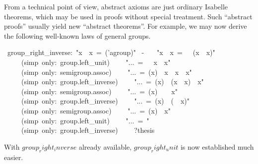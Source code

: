 \begin{isabelle}
\begin{isamarkuptext}
 \medskip From a technical point of view, abstract axioms are just
 ordinary Isabelle theorems, which may be used in proofs without
 special treatment.  Such ``abstract proofs'' usually yield new
 ``abstract theorems''.  For example, we may now derive the following
 well-known laws of general groups.%
\end{isamarkuptext}%
\ group\_right\_inverse:\ {"}x\ {\isasymOtimes}\ x{\isasyminv}\ =\ ({\isasymunit}{\isasymColon}'a{\isasymColon}group){"}\isanewline
{}\ -\isanewline
\ \ \ {"}x\ {\isasymOtimes}\ x{\isasyminv}\ =\ {\isasymunit}\ {\isasymOtimes}\ (x\ {\isasymOtimes}\ x{\isasyminv}){"}\isanewline
\ \ \ \ \ (simp\ only:\ group.left\_unit)\isanewline
\ \ \ \ {"}...\ =\ {\isasymunit}\ {\isasymOtimes}\ x\ {\isasymOtimes}\ x{\isasyminv}{"}\isanewline
\ \ \ \ \ (simp\ only:\ semigroup.assoc)\isanewline
\ \ \ \ {"}...\ =\ (x{\isasyminv}){\isasyminv}\ {\isasymOtimes}\ x{\isasyminv}\ {\isasymOtimes}\ x\ {\isasymOtimes}\ x{\isasyminv}{"}\isanewline
\ \ \ \ \ (simp\ only:\ group.left\_inverse)\isanewline
\ \ \ \ {"}...\ =\ (x{\isasyminv}){\isasyminv}\ {\isasymOtimes}\ (x{\isasyminv}\ {\isasymOtimes}\ x)\ {\isasymOtimes}\ x{\isasyminv}{"}\isanewline
\ \ \ \ \ (simp\ only:\ semigroup.assoc)\isanewline
\ \ \ \ {"}...\ =\ (x{\isasyminv}){\isasyminv}\ {\isasymOtimes}\ {\isasymunit}\ {\isasymOtimes}\ x{\isasyminv}{"}\isanewline
\ \ \ \ \ (simp\ only:\ group.left\_inverse)\isanewline
\ \ \ \ {"}...\ =\ (x{\isasyminv}){\isasyminv}\ {\isasymOtimes}\ ({\isasymunit}\ {\isasymOtimes}\ x{\isasyminv}){"}\isanewline
\ \ \ \ \ (simp\ only:\ semigroup.assoc)\isanewline
\ \ \ \ {"}...\ =\ (x{\isasyminv}){\isasyminv}\ {\isasymOtimes}\ x{\isasyminv}{"}\isanewline
\ \ \ \ \ (simp\ only:\ group.left\_unit)\isanewline
\ \ \ \ {"}...\ =\ {\isasymunit}{"}\isanewline
\ \ \ \ \ (simp\ only:\ group.left\_inverse)\isanewline
\ \ \ \ ?thesis\ \isanewline
{}%
\begin{isamarkuptext}%
\noindent With $group_right_inverse$ already available,
 $group_right_unit$\label{thm:group-right-unit} is now established
 much easier.%
\end{isamarkuptext}%

\end{isabelle}
